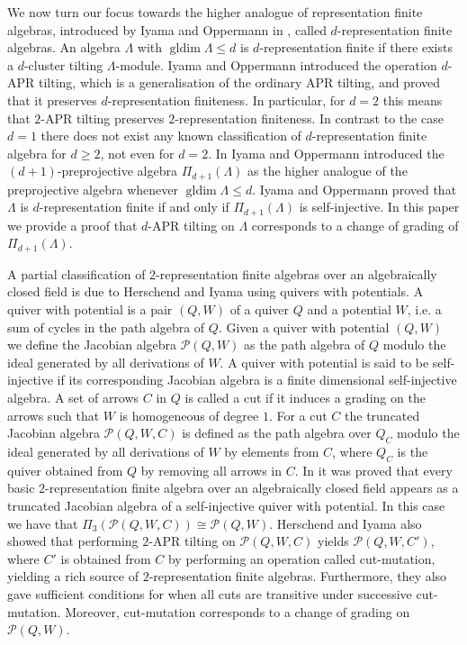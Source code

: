 \documentclass[a4paper, reqno]{amsart}
\theoremstyle{definition}
\DeclareMathOperator{\gldim}{\mathrm{gldim}}
\begin{document}
We now turn our focus towards the higher analogue of representation finite algebras, introduced by Iyama and Oppermann in \cite{IO11nRFalgandnAPRtilt}, called $d$-representation finite algebras. An algebra $\Lambda$ with $\gldim \Lambda \le d$ is $d$-representation finite if there exists a $d$-cluster tilting $\Lambda$-module. Iyama and Oppermann introduced the operation $d$-APR tilting, which is a generalisation of the ordinary APR tilting, and proved that it preserves $d$-representation finiteness. In particular, for $d=2$ this means that $2$-APR tilting preserves $2$-representation finiteness. In contrast to the case $d=1$ there does not exist any known classification of $d$-representation finite algebra for $d\ge 2$, not even for $d=2$. In \cite{IO13Stablecateofhigherpreproj} Iyama and Oppermann introduced the $(d+1)$-preprojective algebra $\Pi_{d+1}(\Lambda)$ as the higher analogue of the preprojective algebra whenever $\gldim \Lambda \le d$. Iyama and Oppermann proved that $\Lambda$ is $d$-representation finite if and only if $\Pi_{d+1}(\Lambda)$ is self-injective. In this paper we provide a proof that $d$-APR tilting on $\Lambda$ corresponds to a change of grading of $\Pi_{d+1}(\Lambda)$.

A partial classification of $2$-representation finite algebras over an algebraically closed field is due to Herschend and Iyama \cite{HerschendOsamu2011quiverwithpotential} using quivers with potentials. A quiver with potential is a pair $(Q, W)$ of a quiver $Q$ and a potential $W$, i.e. a sum of cycles in the path algebra of $Q$. Given a quiver with potential $(Q, W)$ we define the Jacobian algebra $\mathcal{P}(Q, W)$ as the path algebra of $Q$ modulo the ideal generated by all derivations of $W$. A quiver with potential is said to be self-injective if its corresponding Jacobian algebra is a finite dimensional self-injective algebra. A set of arrows $C$ in $Q$ is called a cut if it induces a grading on the arrows such that $W$ is homogeneous of degree $1$. For a cut $C$ the truncated Jacobian algebra $\mathcal{P}(Q, W, C)$ is defined as the path algebra over $Q_C$ modulo the ideal generated by all derivations of $W$ by elements from $C$, where $Q_C$ is the quiver obtained from $Q$ by removing all arrows in $C$. In \cite{HerschendOsamu2011quiverwithpotential} it was proved that every basic $2$-representation finite algebra over an algebraically closed field appears as a truncated Jacobian algebra of a self-injective quiver with potential. In this case we have that $\Pi_3(\mathcal{P}(Q, W, C)) \cong \mathcal{P}(Q, W)$. Herschend and Iyama also showed that performing $2$-APR tilting on $\mathcal{P}(Q, W, C)$ yields $\mathcal{P}(Q, W, C')$, where $C'$ is obtained from $C$ by performing an operation called cut-mutation, yielding a rich source of $2$-representation finite algebras. Furthermore, they also gave sufficient conditions for when all cuts are transitive under successive cut-mutation. Moreover, cut-mutation corresponds to a change of grading on $\mathcal{P}(Q, W)$.
\end{document}

